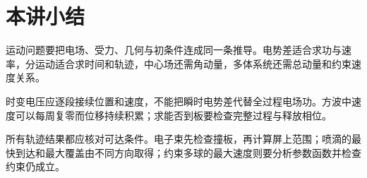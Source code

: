 \section{本讲小结}

运动问题要把电场、受力、几何与初条件连成同一条推导。电势差适合求功与速率，分运动适合求时间和轨迹，中心场还需角动量，多体系统还需总动量和约束速度关系。

时变电压应逐段接续位置和速度，不能把瞬时电势差代替全过程电场功。方波中速度可以每周复零而位移持续积累；求能否到板要检查完整过程与释放相位。

所有轨迹结果都应核对可达条件。电子束先检查撞板，再计算屏上范围；喷滴的最快到达和最大覆盖由不同方向取得；约束多球的最大速度则要分析参数函数并检查约束仍成立。

